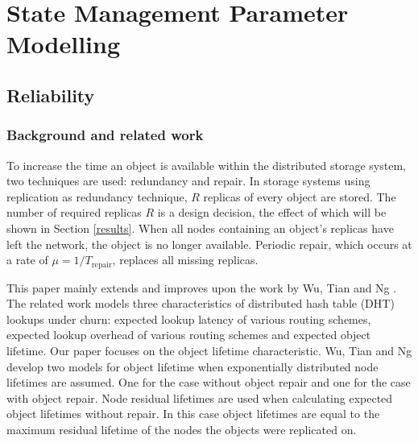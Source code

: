 \chapter{State Management Parameter Modelling}
\label{chp:MODELLING}

\section{Reliability}
\subsection{Background and related work}
\label{related_work}

To increase the time an object is available within the distributed storage system, two techniques are used: redundancy and repair. In storage systems using replication as redundancy technique, $R$ replicas of every object are stored. The number of required replicas $R$ is a design decision, the effect of which will be shown in Section \ref{results}. When all nodes containing an object's replicas have left the network, the object is no longer available. Periodic repair, which occurs at a rate of $\mu = 1/T_{\textrm{repair}}$, replaces all missing replicas.

This paper mainly extends and improves upon the work by Wu, Tian and Ng \cite{replication_article}. The related work models three characteristics of distributed hash table (DHT) lookups under churn: expected lookup latency of various routing schemes, expected lookup overhead of various routing schemes and expected object lifetime. Our paper focuses on the object lifetime characteristic. Wu, Tian and Ng develop two models for object lifetime when exponentially distributed node lifetimes are assumed. One for the case without object repair and one for the case with object repair. Node residual lifetimes are used when calculating expected object lifetimes without repair. In this case object lifetimes are equal to the maximum residual lifetime of the nodes the objects were replicated on.


